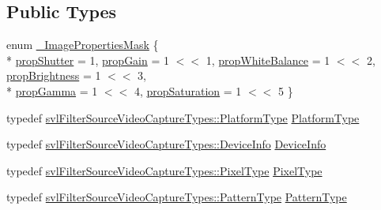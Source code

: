 \subsection*{Public Types}
\begin{DoxyCompactItemize}
\item 
enum \hyperlink{classsvl_filter_source_video_capture_a479413536f6b6d984c08c44b0cbd64f2}{\+\_\+\+Image\+Properties\+Mask} \{ \\*
\hyperlink{classsvl_filter_source_video_capture_a479413536f6b6d984c08c44b0cbd64f2a4d4abed08ff5a841c3cad808d18d88d1}{prop\+Shutter} = 1, 
\hyperlink{classsvl_filter_source_video_capture_a479413536f6b6d984c08c44b0cbd64f2a88da91bf4ae85481673925943068bc37}{prop\+Gain} = 1 $<$$<$ 1, 
\hyperlink{classsvl_filter_source_video_capture_a479413536f6b6d984c08c44b0cbd64f2aede12f2f91b1e017e4027f350ea8035b}{prop\+White\+Balance} = 1 $<$$<$ 2, 
\hyperlink{classsvl_filter_source_video_capture_a479413536f6b6d984c08c44b0cbd64f2ac3c2d9c1e70cc5b6bc1c76ed483cd7a0}{prop\+Brightness} = 1 $<$$<$ 3, 
\\*
\hyperlink{classsvl_filter_source_video_capture_a479413536f6b6d984c08c44b0cbd64f2a5084b58f2483c79dc12662bc03696ddf}{prop\+Gamma} = 1 $<$$<$ 4, 
\hyperlink{classsvl_filter_source_video_capture_a479413536f6b6d984c08c44b0cbd64f2afe5986680c0c4853df93e46902891b37}{prop\+Saturation} = 1 $<$$<$ 5
 \}
\item 
typedef \hyperlink{namespacesvl_filter_source_video_capture_types_aa8ef2b6d9a414a8970cc722eaa37b32b}{svl\+Filter\+Source\+Video\+Capture\+Types\+::\+Platform\+Type} \hyperlink{classsvl_filter_source_video_capture_a75f10dbd026c0ae70007a18758895ea0}{Platform\+Type}
\item 
typedef \hyperlink{classsvl_filter_source_video_capture_types_1_1_device_info}{svl\+Filter\+Source\+Video\+Capture\+Types\+::\+Device\+Info} \hyperlink{classsvl_filter_source_video_capture_ad656487fb2deec890dc39764152b8f8b}{Device\+Info}
\item 
typedef \hyperlink{namespacesvl_filter_source_video_capture_types_a6b2f5fb1010bb41e1fb7232f88fc515f}{svl\+Filter\+Source\+Video\+Capture\+Types\+::\+Pixel\+Type} \hyperlink{classsvl_filter_source_video_capture_a0d92a26e94ffd48535df5ab2ff330c90}{Pixel\+Type}
\item 
typedef \hyperlink{namespacesvl_filter_source_video_capture_types_a1c4eecd5680f271e0f58336666a69485}{svl\+Filter\+Source\+Video\+Capture\+Types\+::\+Pattern\+Type} \hyperlink{classsvl_filter_source_video_capture_a374a69b1d506cf982ba5ce45d5f84776}{Pattern\+Type}
$$
\end{DoxyCompactItemize}
